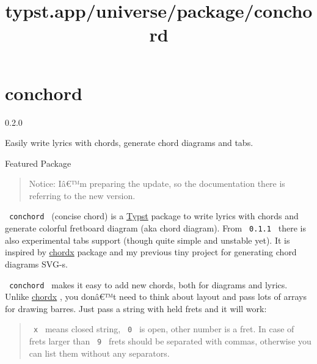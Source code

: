 \title{typst.app/universe/package/conchord}

\label{banner}
\section{conchord}\label{conchord}

{ 0.2.0 }

Easily write lyrics with chords, generate chord diagrams and tabs.

{ } Featured Package

\label{readme}
\begin{quote}
Notice: Iâ€™m preparing the update, so the documentation there is
referring to the new version.
\end{quote}

\texttt{\ conchord\ } (concise chord) is a
\href{https://github.com/typst/typst}{Typst} package to write lyrics
with chords and generate colorful fretboard diagram (aka chord diagram).
From \texttt{\ 0.1.1\ } there is also experimental tabs support (though
quite simple and unstable yet). It is inspired by
\href{https://github.com/ljgago/typst-chords}{chordx} package and my
previous tiny project for generating chord diagrams SVG-s.

\texttt{\ conchord\ } makes it easy to add new chords, both for diagrams
and lyrics. Unlike \href{https://github.com/ljgago/typst-chords}{chordx}
, you donâ€™t need to think about layout and pass lots of arrays for
drawing barres. Just pass a string with held frets and it will work:

\begin{Shaded}
\begin{Highlighting}[]


\end{Highlighting}
\end{Shaded}


\begin{quote}
\texttt{\ x\ } means closed string, \texttt{\ 0\ } is open, other number
is a fret. In case of frets larger than \texttt{\ 9\ } frets should be
separated with commas, otherwise you can list them without any
separators.
\end{quote}

